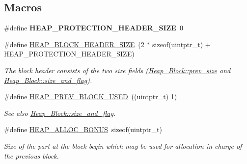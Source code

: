 \subsection*{Macros}
\begin{DoxyCompactItemize}
\item 
\mbox{\label{group__RTEMSScoreHeap_ga833b1a69c25ba6db27d6898181e071b8}} 
\#define {\bfseries H\+E\+A\+P\+\_\+\+P\+R\+O\+T\+E\+C\+T\+I\+O\+N\+\_\+\+H\+E\+A\+D\+E\+R\+\_\+\+S\+I\+ZE}~0
\item 
\mbox{\label{group__RTEMSScoreHeap_ga42b33e85598957dd367de0f3677261f0}} 
\#define \mbox{\hyperlink{group__RTEMSScoreHeap_ga42b33e85598957dd367de0f3677261f0}{H\+E\+A\+P\+\_\+\+B\+L\+O\+C\+K\+\_\+\+H\+E\+A\+D\+E\+R\+\_\+\+S\+I\+ZE}}~(2 $\ast$ sizeof(uintptr\+\_\+t) + H\+E\+A\+P\+\_\+\+P\+R\+O\+T\+E\+C\+T\+I\+O\+N\+\_\+\+H\+E\+A\+D\+E\+R\+\_\+\+S\+I\+ZE)
\begin{DoxyCompactList}\small\item\em The block header consists of the two size fields (\mbox{\hyperlink{structHeap__Block_ac19e44024599b1042cc628ccfd3abf53}{Heap\+\_\+\+Block\+::prev\+\_\+size}} and \mbox{\hyperlink{structHeap__Block_ae6f771ed25f18d98146417d7cf38d69c}{Heap\+\_\+\+Block\+::size\+\_\+and\+\_\+flag}}). \end{DoxyCompactList}\item 
\mbox{\label{group__RTEMSScoreHeap_gad70ff8f1aa0b373fc4d677f43486bc98}} 
\#define \mbox{\hyperlink{group__RTEMSScoreHeap_gad70ff8f1aa0b373fc4d677f43486bc98}{H\+E\+A\+P\+\_\+\+P\+R\+E\+V\+\_\+\+B\+L\+O\+C\+K\+\_\+\+U\+S\+ED}}~((uintptr\+\_\+t) 1)
\begin{DoxyCompactList}\small\item\em See also \mbox{\hyperlink{structHeap__Block_ae6f771ed25f18d98146417d7cf38d69c}{Heap\+\_\+\+Block\+::size\+\_\+and\+\_\+flag}}. \end{DoxyCompactList}\item 
\mbox{\label{group__RTEMSScoreHeap_ga7cfb70eb561f94b43e4271829bebab99}} 
\#define \mbox{\hyperlink{group__RTEMSScoreHeap_ga7cfb70eb561f94b43e4271829bebab99}{H\+E\+A\+P\+\_\+\+A\+L\+L\+O\+C\+\_\+\+B\+O\+N\+US}}~sizeof(uintptr\+\_\+t)
\begin{DoxyCompactList}\small\item\em Size of the part at the block begin which may be used for allocation in charge of the previous block. \end{DoxyCompactList}\item 

\end{DoxyCompactItemize}
